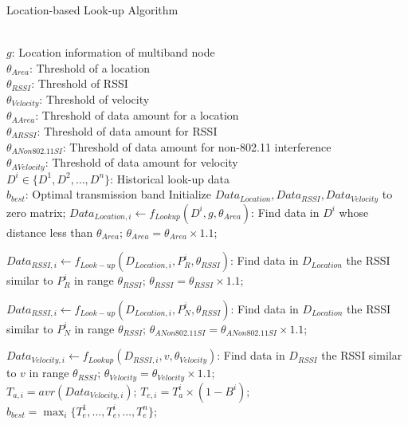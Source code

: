 	  \begin{algorithm}
          \small
	  \caption{Location-based Look-up Algorithm}
	  \label{algorithms: Location}
	  \begin{algorithmic}[1]
	  \REQUIRE  ~~\\
		  $g$: Location information of multiband node\\
		 $ \theta_{Area}$: Threshold of a location\\
		 $\theta_{RSSI}$: Threshold of RSSI\\
		 $\theta_{Velocity}$: Threshold of velocity\\
		 $\theta_{A Area}$: Threshold of data amount for a location\\
		 $\theta_{A RSSI}$: Threshold of data amount for RSSI\\
		 $\theta_{A Non 802.11 SI}$: Threshold of data amount for non-802.11 interference\\
		 $\theta_{A Velocity}$: Threshold of data amount for velocity\\
		 $D^i \in \{D^1,D^2,\dots,D^n\}$: Historical look-up data
\ENSURE ~~\\    
$b_{best}$: Optimal transmission band
\STATE Initialize \emph{$Data_{Location}, Data_{RSSI}, Data_{Velocity}$} to zero matrix;
\STATE $Data_{Location,i} \leftarrow f_{Lookup}(D^i,g,\theta_{Area})$: Find data in $D^i$ whose distance less than $\theta_{Area}$;
\STATE $\theta_{Area}=\theta_{Area} \times 1.1$;
\ENDWHILE

\STATE $Data_{RSSI,i} \leftarrow f_{Look-up}(D_{Location,i},P_R^i,\theta_{RSSI})$: Find data in $D_{Location}$ the RSSI similar to $P_R^i$ in range $\theta_{RSSI}$;
\STATE $\theta_{RSSI}=\theta_{RSSI} \times 1.1$;
\ENDWHILE

\STATE $Data_{RSSI,i} \leftarrow f_{Look-up}(D_{Location,i},P_N^i,\theta_{RSSI})$: Find data in $D_{Location}$ the RSSI similar to $P_N^i$ in range $\theta_{RSSI}$;
\STATE $\theta_{A Non 802.11 SI}=\theta_{A Non 802.11 SI} \times 1.1$;
\ENDWHILE

\STATE $Data_{Velocity,i} \leftarrow f_{Lookup}(D_{RSSI,i},v,\theta_{Velocity})$: Find data in $D_{RSSI}$ the RSSI similar to $v$ in range $\theta_{RSSI}$;
\STATE $\theta_{Velocity}=\theta_{Velocity} \times 1.1$;
\ENDWHILE \\

\STATE $T_{a,i}=avr(Data_{Velocity,i})$;
\STATE  $T_{e,i}=T_a^i\times(1-B^i)$;
\ENDFOR \\  
\STATE $b_{best} = \max_i\{T_e^1,\dots,T_e^i,\dots,T_e^n\}$;\\
\end{algorithmic}
\end{algorithm}

